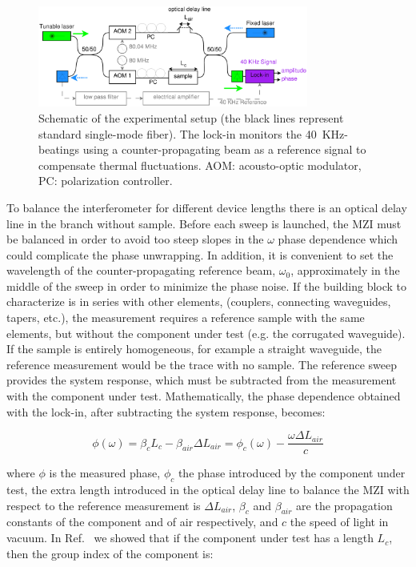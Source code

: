 \documentclass[journal]{IEEEtran}
\newcommand{\fwidthBig}{3.5in}
\begin{document}
\begin{figure}[htb]
	\centering
	\includegraphics[width=\fwidthBig]{dispersion6}
	\caption{Schematic of the experimental setup (the black lines represent standard single-mode fiber).
	The lock-in monitors the 40~KHz-beatings using a counter-propagating beam as a reference signal to compensate thermal fluctuations.
	AOM: acousto-optic modulator, PC: polarization controller. }
	\label{fig:dispersionSetup}
\end{figure}

To balance the interferometer for different device lengths there is an optical delay line in the branch without sample.
Before each sweep is launched, the MZI must be balanced in order to avoid too steep slopes in the $\omega$ phase dependence which could complicate the phase unwrapping.
In addition, it is convenient to set the wavelength of the counter-propagating reference beam, $\omega_0$, approximately in the middle of the sweep in order to minimize the phase noise.
If the building block to characterize is in series with other elements, (couplers, connecting waveguides, tapers, etc.), the measurement requires a reference sample with the same elements, but without the component under test (e.g. the corrugated waveguide). If the sample is entirely homogeneous, for example a straight waveguide, the reference measurement would be the trace with no sample.
The reference sweep provides the system response, which must be subtracted from the measurement with the component under test. 
Mathematically, the phase dependence obtained with the lock-in, after subtracting the system response, becomes:


\begin{equation}
  \phi(\omega)= \beta_c L_c - \beta_{air} \Delta L_{air} =\phi_{c}(\omega)-\frac{\omega\Delta L_{air}}{c}
  \label{eq:response}
\end{equation}

where $\phi$ is the measured phase, $\phi_{c}$ the phase introduced by the component under test, the extra length introduced in the optical delay line to balance the MZI with respect to the reference measurement is $\Delta L_{air}$, $\beta_c$ and $\beta_{air}$ are the propagation constants of the component and of air respectively, and $c$ the speed of light in vacuum.
In Ref.~\cite{Mas2012} we showed that if the component under test has a length $L_{c}$, then the group index of the component is:
\end{document}
